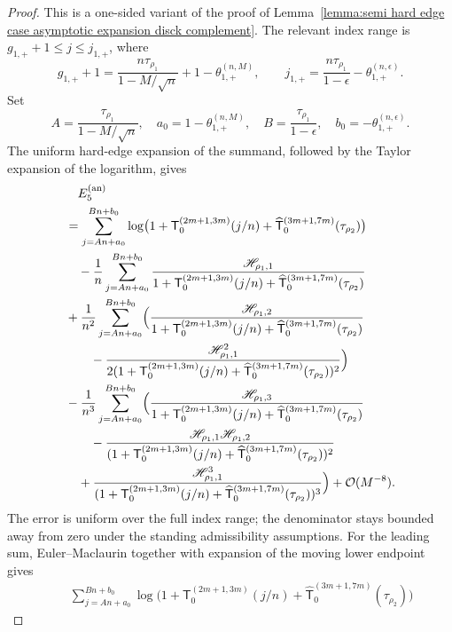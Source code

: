 \documentclass[a4paper]{article}
\numberwithin{equation}{section}
\begin{document}
\begin{proof}
This is a one-sided variant of the proof of
Lemma~\ref{lemma:semi hard edge case asymptotic expansion disck complement}.
The relevant index range is $g_{1,+}+1\le j\le j_{1,+}$, where
\[
g_{1,+}+1=\frac{n\tau_{\rho_1}}{1-M/\sqrt n}
+1-\theta_{1,+}^{(n,M)},\qquad
j_{1,+}=\frac{n\tau_{\rho_1}}{1-\epsilon}
-\theta_{1,+}^{(n,\epsilon)}.
\]
Set
\[
A=\frac{\tau_{\rho_1}}{1-M/\sqrt n},\quad
a_0=1-\theta_{1,+}^{(n,M)},\quad
B=\frac{\tau_{\rho_1}}{1-\epsilon},\quad
b_0=-\theta_{1,+}^{(n,\epsilon)}.
\]
The uniform hard-edge expansion of the summand, followed by the Taylor
expansion of the logarithm, gives
\begin{align*}
&\quad E_5^{(\mathrm{an})}\\
&=  
\sum_{j=An+a_0}^{Bn+b_0}
\log\bigl(1+\mathsf{T}_{0}^{(2m+1,3m)}(j/n)+\widehat{\mathsf{T}}_0^{(3m+1,7m)}(\tau_{\rho_2})\bigr)
\\
&\quad-\frac{1}{n}
\sum_{j=An+a_0}^{Bn+b_0}
\frac{\mathscr{H}_{\rho_1,1}}{1+\mathsf{T}_{0}^{(2m+1,3m)}(j/n)+\widehat{\mathsf{T}}_0^{(3m+1,7m)}(\tau_{\rho_2})}
\\
&
+\frac{1}{n^2}\sum_{j=An+a_0}^{Bn+b_0}\Bigl( 
\frac{\mathscr{H}_{\rho_1,2}}{1+\mathsf{T}_{0}^{(2m+1,3m)}(j/n)+\widehat{\mathsf{T}}_0^{(3m+1,7m)}(\tau_{\rho_2})}\\
&\qquad-\frac{\mathscr{H}_{\rho_1,1}^2}{2(1+\mathsf{T}_{0}^{(2m+1,3m)}(j/n)+\widehat{\mathsf{T}}_0^{(3m+1,7m)}(\tau_{\rho_2}))^2}
\Bigr)
\\
&
-\frac{1}{n^3}
\sum_{j=An+a_0}^{Bn+b_0}
\Bigl( 
\frac{\mathscr{H}_{\rho_1,3}}{1+\mathsf{T}_{0}^{(2m+1,3m)}(j/n)+\widehat{\mathsf{T}}_0^{(3m+1,7m)}(\tau_{\rho_2})}
\\
&\qquad-\frac{\mathscr{H}_{\rho_1,1}\mathscr{H}_{\rho_1,2}}{(1+\mathsf{T}_{0}^{(2m+1,3m)}(j/n)+\widehat{\mathsf{T}}_0^{(3m+1,7m)}(\tau_{\rho_2}))^2}
\\
&\quad
+\frac{\mathscr{H}_{\rho_1,1}^3}{(1+\mathsf{T}_{0}^{(2m+1,3m)}(j/n)+\widehat{\mathsf{T}}_0^{(3m+1,7m)}(\tau_{\rho_2}))^3}
\Bigr)
+\mathcal{O}(M^{-8}).
\end{align*}
The error is uniform over the full index range; the denominator stays bounded
away from zero under the standing admissibility assumptions.  For the leading
sum, Euler--Maclaurin together with expansion of the moving lower endpoint
gives
\begin{align*}
&\quad\sum_{j=An+a_0}^{Bn+b_0}
\log\bigl(1+\mathsf{T}_{0}^{(2m+1,3m)}(j/n)+\widehat{\mathsf{T}}_0^{(3m+1,7m)}(\tau_{\rho_2})\bigr)

\end{align*}
\end{proof}
\end{document}

